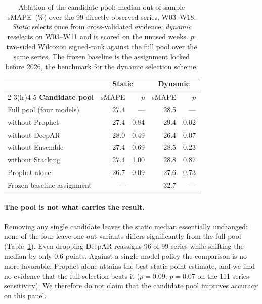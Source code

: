 \documentclass[runningheads]{llncs}
\newcommand{\smape}{sMAPE}
\begin{document}
\begin{table}[t]
\centering
\caption{Ablation of the candidate pool: median out-of-sample \smape\ (\%)
over the 99 directly observed series, W03--W18. \emph{Static} selects once
from cross-validated evidence; \emph{dynamic} reselects on W03--W11 and is
scored on the unused weeks. $p$: two-sided Wilcoxon signed-rank against
the full pool over the same series. The frozen baseline is the
assignment locked before 2026, the benchmark for the dynamic selection
scheme.}
\label{tab:ablation}
\setlength{\tabcolsep}{6pt}
\renewcommand{\arraystretch}{1.1}
\footnotesize
\begin{tabular}{@{}l rr rr@{}}
\toprule
& \multicolumn{2}{c}{\textbf{Static}} & \multicolumn{2}{c}{\textbf{Dynamic}}\\
\cmidrule(lr){2-3}\cmidrule(lr){4-5}
\textbf{Candidate pool} & \smape & $p$ & \smape & $p$\\
\midrule
Full pool (four models)      & 27.4 & ---   & 28.5 & ---\\
\quad without Prophet        & 27.4 & 0.84  & 29.4 & 0.02\\
\quad without DeepAR         & 28.0 & 0.49  & 26.4 & 0.07\\
\quad without Ensemble       & 27.4 & 0.69  & 28.5 & 0.23\\
\quad without Stacking       & 27.4 & 1.00  & 28.8 & 0.87\\
\addlinespace
Prophet alone                & 26.7 & 0.09  & 27.6 & 0.73\\
\midrule
Frozen baseline assignment   & \multicolumn{2}{c}{---} & 32.7 & ---\\
\bottomrule
\end{tabular}
\end{table}

\paragraph{The pool is not what carries the result.}
Removing any single candidate leaves the static median essentially
unchanged: none of the four leave-one-out variants differs significantly
from the full pool (Table~\ref{tab:ablation}). Even dropping DeepAR
reassigns 96 of 99 series while shifting the median by only $0.6$
points. Against a
single-model policy the comparison is no more favorable: Prophet alone
attains the best static point estimate, and we find no evidence that the
full selection beats it ($p{=}0.09$; $p{=}0.07$ on the 111-series
sensitivity). We therefore do not claim that
the candidate pool improves accuracy on this panel.
\end{document}
